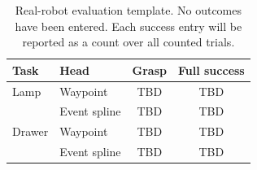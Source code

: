 \begin{table}[t]
\centering
\caption{Real-robot evaluation template. No outcomes have been entered.
Each success entry will be reported as a count over all counted trials.}
\label{tab:hardware}
\setlength{\tabcolsep}{5pt}
\begin{tabular}{llcc}
\toprule
Task & Head & Grasp & Full success \\
\midrule
Lamp & Waypoint & TBD & TBD \\
     & Event spline & TBD & TBD \\
Drawer & Waypoint & TBD & TBD \\
       & Event spline & TBD & TBD \\
\bottomrule
\end{tabular}
\end{table}

